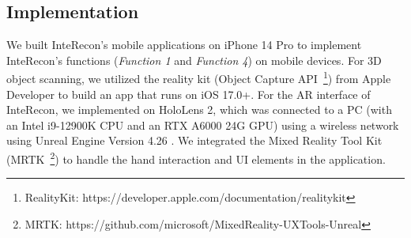 






\subsection{Implementation}
\label{implementation}
We built InteRecon's mobile applications on iPhone 14 Pro to implement InteRecon's functions (\emph{Function 1} and \emph{Function 4}) on mobile devices. For 3D object scanning, we utilized the reality kit (Object Capture API~\footnote{RealityKit: https://developer.apple.com/documentation/realitykit}) from Apple Developer to build an app that runs on iOS 17.0+. 
For the AR interface of InteRecon, we implemented on HoloLens 2, which was connected to a PC (with an Intel i9-12900K CPU and an RTX A6000 24G GPU) using a wireless network using Unreal Engine Version 4.26 .
We integrated the Mixed Reality Tool Kit (MRTK~\footnote{MRTK: https://github.com/microsoft/MixedReality-UXTools-Unreal}) to handle the hand interaction and UI elements in the application. 

